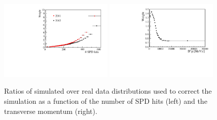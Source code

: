 \begin{figure}[h!]
\centering
\includegraphics[width=0.48\textwidth]{RKst/figs/nspd_w.pdf}
\includegraphics[width=0.48\textwidth]{RKst/figs/bpt_w.pdf}
\caption{ Ratios of simulated over real data distributions used to correct the simulation
as a function of the number of SPD hits (left) and the \Bz transverse momentum (right). }
\label{fig:b0pt_nSPD_ratios}
\end{figure}



